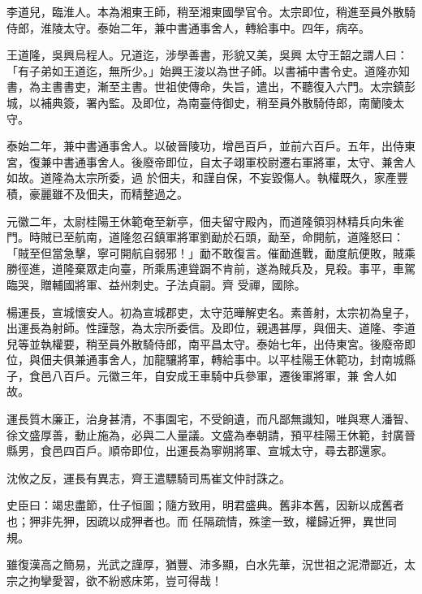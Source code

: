 \begin{pinyinscope}
 李道兒，臨淮人。本為湘東王師，稍至湘東國學官令。太宗即位，稍進至員外散騎侍郎，淮陵太守。泰始二年，兼中書通事舍人，轉給事中。四年，病卒。



 王道隆，吳興烏程人。兄道迄，涉學善書，形貌又美，吳興
 太守王韶之謂人曰：「有子弟如王道迄，無所少。」始興王浚以為世子師。以書補中書令史。道隆亦知書，為主書書吏，漸至主書。世祖使傳命，失旨，遣出，不聽復入六門。太宗鎮彭城，以補典簽，署內監。及即位，為南臺侍御史，稍至員外散騎侍郎，南蘭陵太守。



 泰始二年，兼中書通事舍人。以破晉陵功，增邑百戶，並前六百戶。五年，出侍東宮，復兼中書通事舍人。後廢帝即位，自太子翊軍校尉遷右軍將軍，太守、兼舍人如故。道隆為太宗所委，過
 於佃夫，和謹自保，不妄毀傷人。執權既久，家產豐積，豪麗雖不及佃夫，而精整過之。



 元徽二年，太尉桂陽王休範奄至新亭，佃夫留守殿內，而道隆領羽林精兵向朱雀門。時賊已至航南，道隆忽召鎮軍將軍劉勔於石頭，勔至，命開航，道隆怒曰：「賊至但當急擊，寧可開航自弱邪！」勔不敢復言。催勔進戰，勔度航便敗，賊乘勝徑進，道隆棄眾走向臺，所乘馬連聳跼不肯前，遂為賊兵及，見殺。事平，車駕臨哭，贈輔國將軍、益州刺史。子法貞嗣。齊
 受禪，國除。



 楊運長，宣城懷安人。初為宣城郡吏，太守范曄解吏名。素善射，太宗初為皇子，出運長為射師。性謹愨，為太宗所委信。及即位，親遇甚厚，與佃夫、道隆、李道兒等並執權要，稍至員外散騎侍郎，南平昌太守。泰始七年，出侍東宮。後廢帝即位，與佃夫俱兼通事舍人，加龍驤將軍，轉給事中。以平桂陽王休範功，封南城縣子，食邑八百戶。元徽三年，自安成王車騎中兵參軍，遷後軍將軍，兼
 舍人如故。



 運長質木廉正，治身甚清，不事園宅，不受餉遺，而凡鄙無識知，唯與寒人潘智、徐文盛厚善，動止施為，必與二人量議。文盛為奉朝請，預平桂陽王休範，封廣晉縣男，食邑四百戶。順帝即位，出運長為寧朔將軍、宣城太守，尋去郡還家。



 沈攸之反，運長有異志，齊王遣驃騎司馬崔文仲討誅之。



 史臣曰：竭忠盡節，仕子恒圖；隨方致用，明君盛典。舊非本舊，因新以成舊者也；狎非先狎，因疏以成狎者也。而
 任隔疏情，殊塗一致，權歸近狎，異世同規。



 雖復漢高之簡易，光武之謹厚，猶豐、沛多顯，白水先華，況世祖之泥滯鄙近，太宗之拘攣愛習，欲不紛惑床笫，豈可得哉！



\end{pinyinscope}